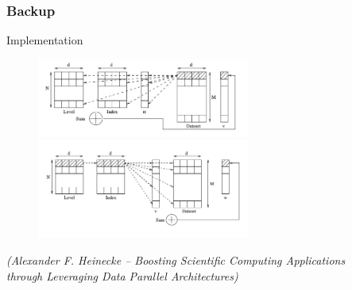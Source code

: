 \begingroup
\renewcommand{\insertframenumber}{43}
 \begin{frame}
  \frametitle{Backup}
  \topline
  \vspace{-10px}
  \addtocounter{framenumber}{-1}
  \begin{block}{Implementation}
    \begin{figure}[!htp]
      \centering
      \includegraphics[width=7cm]{images/impl_1}\\
      \includegraphics[width=7cm]{images/impl_2}
      \vspace{-12px}
      \caption{}
    \end{figure}
    \vspace{-30px}
    \begin{flushright}
      \tiny{\emph{(Alexander F. Heinecke -- Boosting Scientific Computing Applications\\
through Leveraging
Data Parallel Architectures)}}
    \end{flushright}
  \end{block}
 \end{frame}
\endgroup
